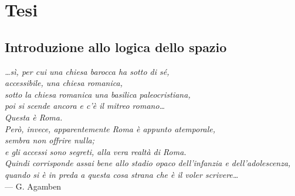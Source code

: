 
\part{Tesi}

\chapter{Introduzione allo logica dello spazio}
\label{cap:spazio}

\vfill

\begin{flushright}{\slshape
  …sì, per cui una chiesa barocca ha sotto di sé, \\
  accessibile, una chiesa romanica, \\
  sotto la chiesa romanica una basilica paleocristiana, \\
  poi si scende ancora e c’è il mitreo romano… \\
  Questa è Roma. \\
  Però, invece, apparentemente Roma è appunto atemporale, \\
  sembra non offrire nulla; \\
  e gli accessi sono segreti, alla vera realtà di Roma. \\
  Quindi corrisponde assai bene allo stadio opaco dell’infanzia e dell’adolescenza, \\
  quando si è in preda a questa cosa strana che è il voler scrivere…} \\ \medskip
    --- G. Agamben
\end{flushright}



